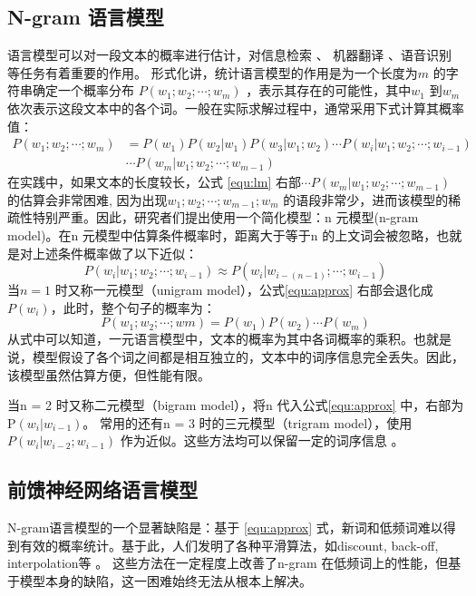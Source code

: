 \documentclass[12pt,a4paper]{article}
\begin{document}
\subsection{N-gram 语言模型}
语言模型可以对一段文本的概率进行估计，对信息检索 \cite{Jin:2002:TLM:564376.564386}、 机器翻译 \cite{DBLP:conf/naacl/BaltescuB15}、语音识别 \cite{DBLP:conf/interspeech/SakSB14} 等任务有着重要的作用。
形式化讲，统计语言模型的作用是为一个长度为$m$ 的字符串确定一个概率分布 $P(w_1;w_2;\cdots;w_m)$ ，表示其存在的可能性，其中$w_1$ 到$w_m$ 依次表示这段文本中的各个词。一般在实际求解过程中，通常采用下式计算其概率值：
\begin{equation}
\label{equ:lm}
\begin{split}
P(w_1;w_2; \cdots;w_m) &= P(w_1) P(w_2|w_1) P(w_3|w_1;w_2)\cdots P(w_i | w_1;w_2;\cdots;w_{i-1}) \\
&\cdots P(w_m | w_1;w_2;\cdots;w_{m-1})
\end{split}
\end{equation}
在实践中，如果文本的长度较长，公式 \ref{equ:lm} 右部$\cdots P(w_m | w_1;w_2;\cdots;w_{m-1}) $  的估算会非常困难, 因为出现$w_1;w_2;\cdots;w_{m-1};w_{m}$ 的语段非常少，进而该模型的稀疏性特别严重。因此，研究者们提出使用一个简化模型：n 元模型(n-gram model)。在n 元模型中估算条件概率时，距离大于等于n 的上文词会被忽略，也就是对上述条件概率做了以下近似：
\begin{equation}
\label{equ:approx}
P(w_i | w_1;w_2;\cdots;w_{i-1})  \approx P(w_i | w_{i-(n-1)};\cdots;w_{i-1})
\end{equation}
当$n = 1$ 时又称一元模型（unigram model），公式\ref{equ:approx} 右部会退化成$P(w_i)$，此时，整个句子的概率为：
\begin{equation}
P(w_1;w_2; \cdots;wm) = P(w_1)P(w_2) \cdots P(w_m)
\end{equation}
从式中可以知道，一元语言模型中，文本的概率为其中各词概率的乘积。也就是说，模型假设了各个词之间都是相互独立的，文本中的词序信息完全丢失。因此，该模型虽然估算方便，但性能有限。

当n = 2 时又称二元模型（bigram model），将n 代入公式\ref{equ:approx} 中，右部为P$(w_i|w_{i-1})$。 常用的还有n = 3 时的三元模型（trigram model），使用$P(w_i |w_{i-2};w_{i-1})$ 作为近似。这些方法均可以保留一定的词序信息 \cite{DBLP:journals/csl/ChenG99}。

\subsection{前馈神经网络语言模型}
N-gram语言模型的一个显著缺陷是：基于 \ref{equ:approx} 式，新词和低频词难以得到有效的概率统计。基于此，人们发明了各种平滑算法，如discount, back-off, interpolation等 \cite{DBLP:conf/interspeech/2009,DBLP:journals/csl/ZhouL99}。 这些方法在一定程度上改善了n-gram 在低频词上的性能，但基于模型本身的缺陷，这一困难始终无法从根本上解决。
\end{document}
